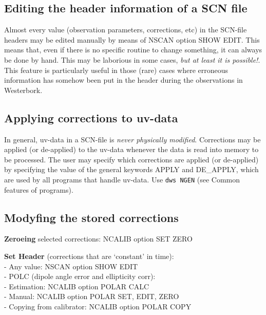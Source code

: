 \subsection{Editing the header information of a SCN file} 
\label{scn.int} 

	Almost every value (observation parameters, corrections, etc) in the 
SCN-file headers may be edited manually by means of NSCAN option 
SHOW EDIT.  This means that, even if there is no specific \NEWSTAR routine to
change something, it can always be done by hand.  This may be laborious in some
cases, {\em but at least it is possible!}.  This feature is particularly useful
in those (rare) cases where erroneous information has somehow been put in the
header during the observations in Westerbork. 


\subsection{Applying corrections to uv-data} 
\label{scn.apply} 

	In general, uv-data in a SCN-file is {\em never physically modified}. 
Corrections may be applied (or de-applied) to the uv-data whenever the data is
read into memory to be processed.  The user may specify which corrections are
applied (or de-applied) by specifying the value of the general \NEWSTAR
keywords APPLY and DE\_APPLY, which are used by all \NEWSTAR programs that
handle uv-data.  Use {\tt dws NGEN} 
(see Common features of \NEWSTAR programs). 


\subsection{Modyfing the stored corrections} 
\label{scn.modify} 

{\bf Zeroeing} selected corrections: NCALIB option SET ZERO 

{\bf Set Header} (corrections that are `constant' in time):\\ 
- Any value: NSCAN option SHOW EDIT\\ 
- POLC (dipole angle error and ellipticity corr):\\ 
\hspace*{5mm} - Estimation: NCALIB option POLAR CALC\\ 
\hspace*{5mm} - Manual: NCALIB option POLAR SET, EDIT, ZERO\\ 
\hspace*{5mm} - Copying from calibrator: NCALIB option POLAR COPY\\ 


